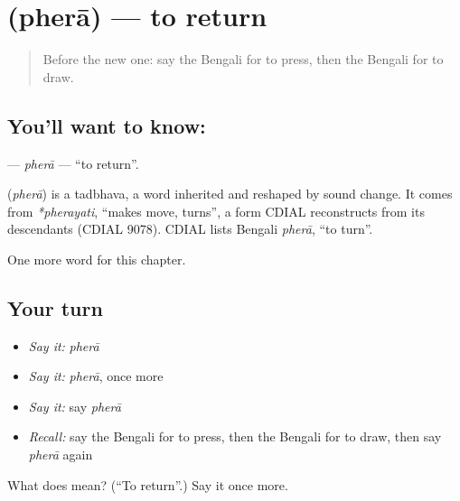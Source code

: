 \section[\texorpdfstring{\bn{ফেরা} (pherā)}{ফেরা (pherā)}]{ (pherā) — to return}

\label{lesson:BN-C106-phera}



\begin{quote}
Before the new one: say the Bengali for to press, then the Bengali for to draw.
\end{quote}

\subsection*{You'll want to know: }
\textbf{} — \emph{pherā} — \textquotedblleft{}to return\textquotedblright{}.

\begin{cousinweb}
\textbf{} (\emph{pherā}) is a tadbhava, a word inherited and reshaped by sound change. It comes from \emph{*pherayati}, \textquotedblleft{}makes move, turns\textquotedblright{}, a form CDIAL reconstructs from its descendants (CDIAL 9078). CDIAL lists Bengali \emph{pherā}, \textquotedblleft{}to turn\textquotedblright{}.
\end{cousinweb}

\begin{grammarlens}[title={What you've built}]
One more word for this chapter.
\end{grammarlens}

\subsection*{Your turn}
\begin{itemize}
\raggedright
  \item \emph{Say it:} \emph{pherā}
  \item \emph{Say it:} \emph{pherā}, once more
  \item \emph{Say it:} say \emph{pherā}
  \item \emph{Recall:} say the Bengali for to press, then the Bengali for to draw, then say \emph{pherā} again
\end{itemize}

\begin{tcolorbox}[breakable,colback=teal!4,colframe=teal!35!black,title={Before you move on}]
What does  mean? (\textquotedblleft{}To return\textquotedblright{}.) Say it once more.
\end{tcolorbox}
